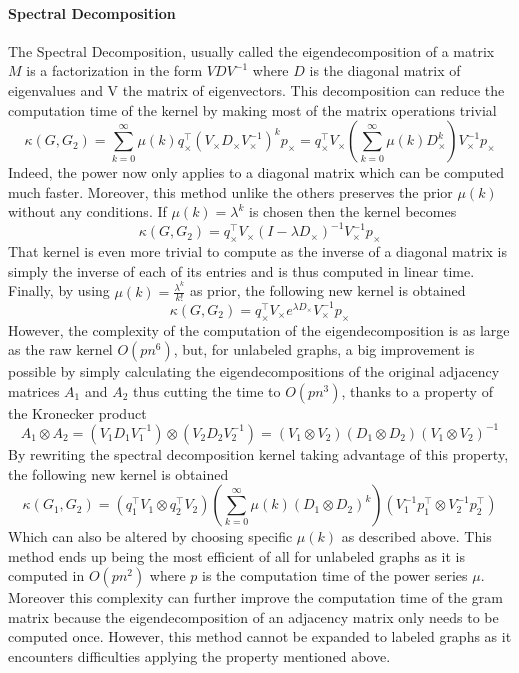 \documentclass{article}
\theoremstyle{definition}
\begin{document}
\paragraph{Spectral Decomposition}
The Spectral Decomposition, usually called the eigendecomposition of a matrix $M$ is a factorization in the form $VDV^{-1}$ where $D$ is the diagonal matrix of eigenvalues and V the matrix of eigenvectors. This decomposition can reduce the computation time of the kernel by making most of the matrix operations trivial
\begin{equation}
	\kappa(G,G_2)=\sum\limits_{k=0}^{\infty}\mu(k)q_{\times}^{\top}(V_{\times}D_{\times}V_{\times}^{-1})^{k}p_{\times} = q_{\times}^{\top}V_{\times}\left(\sum\limits_{k=0}^{\infty}\mu(k)D_{\times}^{k}\right)V_{\times}^{-1}p_{\times}
\end{equation}
Indeed, the power now only applies to a diagonal matrix which can be computed much faster. Moreover, this method unlike the others preserves the prior $\mu(k)$ without any conditions. If $\mu(k)=\lambda^k$ is chosen then the kernel becomes
\begin{equation}
	\kappa(G,G_2)=q_{\times}^{\top}V_{\times}(I-\lambda D_{\times})^{-1}V_{\times}^{-1}p_{\times}
\end{equation}
That kernel is even more trivial to compute as the inverse of a diagonal matrix is simply the inverse of each of its entries and is thus computed in linear time. Finally, by using $\mu(k)=\frac{\lambda^k}{k!}$  as prior, the following new kernel is obtained
\begin{equation}
	\kappa(G,G_2)=q_{\times}^{\top}V_{\times}{e^{\lambda D_{\times}}}V_{\times}^{-1}p_{\times}
\end{equation}
However, the complexity of the computation of the eigendecomposition is as large as the raw kernel $O(pn^6)$, but, for unlabeled graphs, a big improvement is possible by simply calculating the eigendecompositions of the original adjacency matrices $A_1$ and $A_2$ thus cutting the time to $O(pn^3)$, thanks to a property of the Kronecker product
\begin{equation}
	A_1 \otimes A_2=(V_{1}D_{1}V_{1}^{-1})\otimes(V_{2}D_{2}V_{2}^{-1})=(V_1\otimes V_2)(D_1 \otimes D_2)(V_1 \otimes V_2)^{-1}
\end{equation}
By rewriting the spectral decomposition kernel taking advantage of this property, the following new kernel is obtained
\begin{equation}
	\kappa(G_1,G_2)=(q_{1}^{\top}V_{1}\otimes q_{2}^{\top}V_{2})(\sum\limits_{k=0}^{\infty}\mu(k)(D_{1}\otimes D_{2})^k)(V_{1}^{-1}p_{1}^{\top}\otimes V_{2}^{-1}p_{2}^{\top})
\end{equation}
Which can also be altered by choosing specific $\mu(k)$ as described above. This method ends up being the most efficient of all for unlabeled graphs as it is computed in $O(pn^2)$ where $p$ is the computation time of the power series $\mu$. Moreover this complexity can further improve the computation time of the gram matrix because the eigendecomposition of an adjacency matrix only needs to be computed once. However, this method cannot be expanded to labeled graphs as it encounters difficulties applying the property mentioned above.
\end{document}

